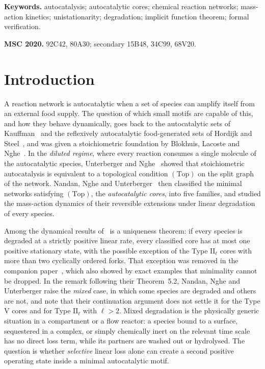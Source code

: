\documentclass[11pt,a4paper]{article}
\theoremstyle{plain}
\theoremstyle{definition}
\theoremstyle{remark}
\numberwithin{equation}{section}
\newcommand{\II}{\mathrm{II}}
\newcommand{\V}{\mathrm{V}}
\newcommand{\Top}{\mathrm{(Top)}}
\begin{document}
\noindent\textbf{Keywords.} autocatalysis; autocatalytic cores; chemical reaction networks; mass-action kinetics; unistationarity; degradation; implicit function theorem; formal verification.

\medskip
\noindent\textbf{MSC 2020.} 92C42, 80A30; secondary 15B48, 34C99, 68V20.

\section{Introduction}\label{sec:intro}

A reaction network is autocatalytic when a set of species can amplify itself from an external food supply. The question of which small motifs are capable of this, and how they behave dynamically, goes back to the autocatalytic sets of Kauffman~\cite{Kau86} and the reflexively autocatalytic food-generated sets of Hordijk and Steel~\cite{HS04}, and was given a stoichiometric foundation by Blokhuis, Lacoste and Nghe~\cite{BLN20}. In the \emph{diluted regime}, where every reaction consumes a single molecule of the autocatalytic species, Unterberger and Nghe~\cite{UN22} showed that stoichiometric autocatalysis is equivalent to a topological condition $\Top$ on the split graph of the network. Nandan, Nghe and Unterberger~\cite{NNU26} then classified the minimal networks satisfying $\Top$, the \emph{autocatalytic cores}, into five families, and studied the mass-action dynamics of their reversible extensions under linear degradation of every species.

Among the dynamical results of~\cite{NNU26} is a uniqueness theorem: if every species is degraded at a strictly positive linear rate, every classified core has at most one positive stationary state, with the possible exception of the Type $\II_\ell$ cores with more than two cyclically ordered forks. That exception was removed in the companion paper~\cite{TypeIIpos}, which also showed by exact examples that minimality cannot be dropped. In the remark following their Theorem~5.2, Nandan, Nghe and Unterberger raise the \emph{mixed} case, in which some species are degraded and others are not, and note that their continuation argument does not settle it for the Type $\V$ cores and for Type $\II_\ell$ with $\ell>2$. Mixed degradation is the physically generic situation in a compartment or a flow reactor: a species bound to a surface, sequestered in a complex, or simply chemically inert on the relevant time scale has no direct loss term, while its partners are washed out or hydrolysed. The question is whether \emph{selective} linear loss alone can create a second positive operating state inside a minimal autocatalytic motif.
\end{document}
